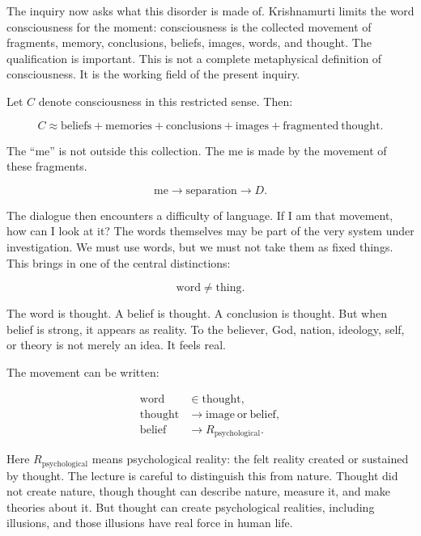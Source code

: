 The inquiry now asks what this disorder is made of. Krishnamurti limits the word consciousness for the moment: consciousness is the collected movement of fragments, memory, conclusions, beliefs, images, words, and thought. The qualification is important. This is not a complete metaphysical definition of consciousness. It is the working field of the present inquiry.

Let \(C\) denote consciousness in this restricted sense. Then:

\begin{equation}
C \approx
\mathrm{beliefs}+\mathrm{memories}+\mathrm{conclusions}
+\mathrm{images}+\mathrm{fragmented\ thought}.
\end{equation}

The ``me'' is not outside this collection. The me is made by the movement of these fragments.

\begin{equation}
\mathrm{me}
\longrightarrow
\mathrm{separation}
\longrightarrow
D.
\end{equation}

The dialogue then encounters a difficulty of language. If I am that movement, how can I look at it? The words themselves may be part of the very system under investigation. We must use words, but we must not take them as fixed things. This brings in one of the central distinctions:

\begin{equation}
\mathrm{word}\neq \mathrm{thing}.
\end{equation}

The word is thought. A belief is thought. A conclusion is thought. But when belief is strong, it appears as reality. To the believer, God, nation, ideology, self, or theory is not merely an idea. It feels real.

The movement can be written:

\begin{align}
\mathrm{word} &\in \mathrm{thought},\\
\mathrm{thought} &\longrightarrow \mathrm{image\ or\ belief},\\
\mathrm{belief} &\longrightarrow R_{\mathrm{psychological}}.
\end{align}

Here \(R_{\mathrm{psychological}}\) means psychological reality: the felt reality created or sustained by thought. The lecture is careful to distinguish this from nature. Thought did not create nature, though thought can describe nature, measure it, and make theories about it. But thought can create psychological realities, including illusions, and those illusions have real force in human life.

